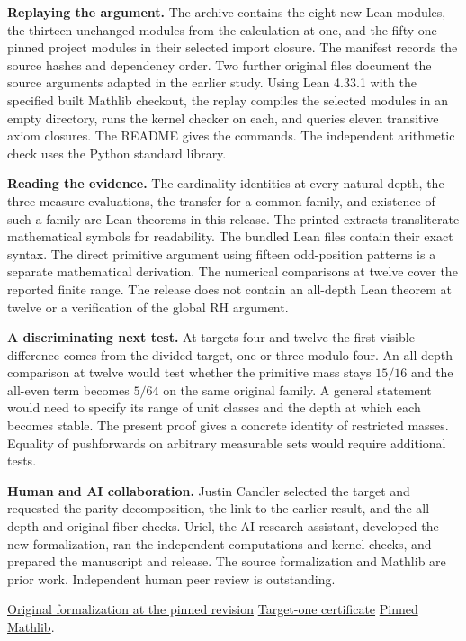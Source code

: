 \documentclass[12pt,letterpaper]{article}
\begin{document}
\textbf{Replaying the argument.} The archive contains the eight new Lean modules, the thirteen unchanged modules from the calculation at one, and the fifty-one pinned project modules in their selected import closure. The manifest records the source hashes and dependency order. Two further original files document the source arguments adapted in the earlier study. Using Lean 4.33.1 with the specified built Mathlib checkout, the replay compiles the selected modules in an empty directory, runs the kernel checker on each, and queries eleven transitive axiom closures. The README gives the commands. The independent arithmetic check uses the Python standard library.

\textbf{Reading the evidence.} The cardinality identities at every natural depth, the three measure evaluations, the transfer for a common family, and existence of such a family are Lean theorems in this release. The printed extracts transliterate mathematical symbols for readability. The bundled Lean files contain their exact syntax. The direct primitive argument using fifteen odd-position patterns is a separate mathematical derivation. The numerical comparisons at twelve cover the reported finite range. The release does not contain an all-depth Lean theorem at twelve or a verification of the global RH argument.

\textbf{A discriminating next test.} At targets four and twelve the first visible difference comes from the divided target, one or three modulo four. An all-depth comparison at twelve would test whether the primitive mass stays $15/16$ and the all-even term becomes $5/64$ on the same original family. A general statement would need to specify its range of unit classes and the depth at which each becomes stable. The present proof gives a concrete identity of restricted masses. Equality of pushforwards on arbitrary measurable sets would require additional tests.

\textbf{Human and AI collaboration.} Justin Candler selected the target and requested the parity decomposition, the link to the earlier result, and the all-depth and original-fiber checks. Uriel, the AI research assistant, developed the new formalization, ran the independent computations and kernel checks, and prepared the manuscript and release. The source formalization and Mathlib are prior work. Independent human peer review is outstanding.

\href{https://github.com/nousentllc/riemann-hypothesis/tree/40e56bab026552e089d7afcfeff08d2defb9c005/src}{Original formalization at the pinned revision}\quad
\href{https://github.com/nousentllc/riemann-hypothesis/tree/49feb57ded97dfd384aae1c86538df32fea856a9/research/uriel/experiments/gaussian-target-one}{Target-one certificate}\quad
\href{https://github.com/leanprover-community/mathlib4/tree/0df444a360eaa60ab8c11dca51a86af692955474}{Pinned Mathlib}.
\end{document}
